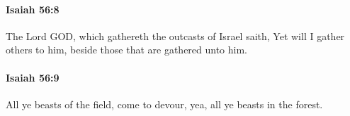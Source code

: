 		\paragraph{Isaiah 56:8} %
			\label{ISAIAH-56-8}

			The Lord GOD, which gathereth the outcasts of Israel saith, Yet will I gather others to him, beside those that are gathered unto him.


		\paragraph{Isaiah 56:9} %
			\label{ISAIAH-56-9}

			All ye beasts of the field, come to devour, yea, all ye beasts in the forest.


